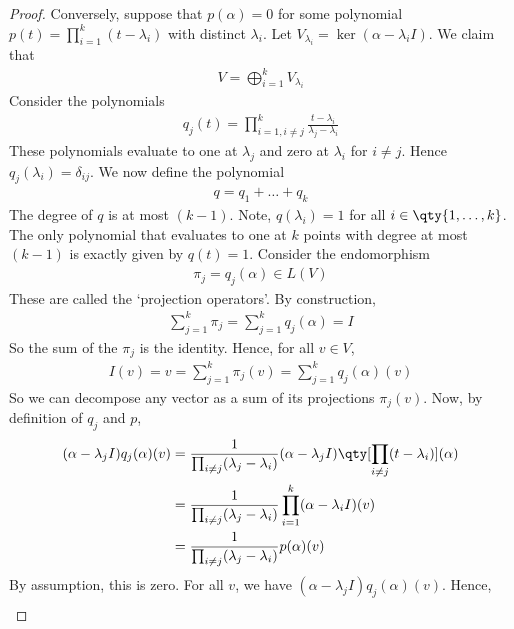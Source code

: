 \begin{proof}
	Conversely, suppose that $p(\alpha) = 0$ for some polynomial $p(t) = \prod_{i=1}^k (t-\lambda_i)$ with distinct $\lambda_i$.
	Let $V_{\lambda_i} = \ker(\alpha - \lambda_i I)$.
	We claim that
	\begin{align*}
		V = \bigoplus_{i=1}^k V_{\lambda_i}
	\end{align*}
	Consider the polynomials
	\begin{align*}
		q_j(t) = \prod_{i=1,i \neq j}^k \frac{t-\lambda_i}{\lambda_j - \lambda_i}
	\end{align*}
	These polynomials evaluate to one at $\lambda_j$ and zero at $\lambda_i$ for $i \neq j$.
	Hence $q_j(\lambda_i) = \delta_{ij}$.
	We now define the polynomial
	\begin{align*}
		q = q_1 + \dots + q_k
	\end{align*}
	The degree of $q$ is at most $(k-1)$.
	Note, $q(\lambda_i) = 1$ for all $i \in \qty{1, \dots, k}$.
	The only polynomial that evaluates to one at $k$ points with degree at most $(k-1)$ is exactly given by $q(t) = 1$.
	Consider the endomorphism
	\begin{align*}
		\pi_j = q_j(\alpha) \in L(V)
	\end{align*}
	These are called the `projection operators'.
	By construction,
	\begin{align*}
		\sum_{j=1}^k \pi_j = \sum_{j=1}^k q_j(\alpha) = I
	\end{align*}
	So the sum of the $\pi_j$ is the identity.
	Hence, for all $v \in V$,
	\begin{align*}
		I(v) = v = \sum_{j=1}^k \pi_j(v) = \sum_{j=1}^k q_j(\alpha)(v)
	\end{align*}
	So we can decompose any vector as a sum of its projections $\pi_j(v)$.
	Now, by definition of $q_j$ and $p$,
	\begin{align*}
		(\alpha - \lambda_j I) q_j(\alpha)(v) & = \frac{1}{\prod_{i \neq j} (\lambda_j - \lambda_i)} (\alpha - \lambda_j I) \qty[\prod_{i \neq j} (t - \lambda_i)] (\alpha) \\
		                                      & = \frac{1}{\prod_{i \neq j} (\lambda_j - \lambda_i)} \prod_{i=1}^k (\alpha - \lambda_i I)(v)                                \\
		                                      & = \frac{1}{\prod_{i \neq j} (\lambda_j - \lambda_i)} p(\alpha)(v)
	\end{align*}
	By assumption, this is zero.
	For all $v$, we have $(\alpha - \lambda_j I) q_j(\alpha)(v)$.
	Hence,
	\begin{align*}

\end{align*}
\end{proof}
